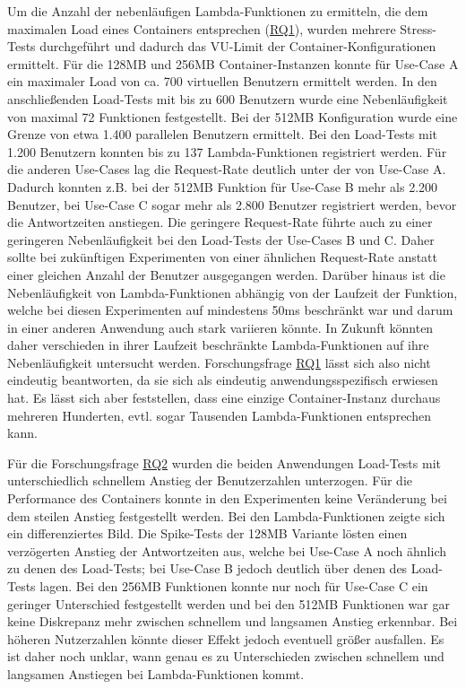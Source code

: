 Um die Anzahl der nebenläufigen Lambda-Funktionen zu ermitteln, die dem maximalen Load eines Containers entsprechen (\hyperref[tab:research-questions]{RQ1}), wurden mehrere Stress-Tests durchgeführt und dadurch das \ac{VU}-Limit der Container-Konfigurationen ermittelt. Für die 128MB und 256MB Container-Instanzen konnte für Use-Case A ein maximaler Load von ca. 700 virtuellen Benutzern ermittelt werden. In den anschließenden Load-Tests mit bis zu 600 Benutzern wurde eine Nebenläufigkeit von maximal 72 Funktionen festgestellt. Bei der 512MB Konfiguration wurde eine Grenze von etwa 1.400 parallelen Benutzern ermittelt. Bei den Load-Tests mit 1.200 Benutzern konnten bis zu 137 Lambda-Funktionen registriert werden. 
Für die anderen Use-Cases lag die Request-Rate deutlich unter der von Use-Case A. Dadurch konnten z.B. bei der 512MB Funktion für Use-Case B mehr als 2.200 Benutzer, bei Use-Case C sogar mehr als 2.800 Benutzer registriert werden, bevor die Antwortzeiten anstiegen. Die geringere Request-Rate führte auch zu einer geringeren Nebenläufigkeit bei den Load-Tests der Use-Cases B und C. Daher sollte bei zukünftigen Experimenten von einer ähnlichen Request-Rate anstatt einer gleichen Anzahl der Benutzer ausgegangen werden.
Darüber hinaus ist die Nebenläufigkeit von Lambda-Funktionen abhängig von der Laufzeit der Funktion, welche bei diesen Experimenten auf mindestens 50ms beschränkt war und darum in einer anderen Anwendung auch stark variieren könnte. In Zukunft könnten daher verschieden in ihrer Laufzeit beschränkte Lambda-Funktionen auf ihre Nebenläufigkeit untersucht werden.
Forschungsfrage \hyperref[tab:research-questions]{RQ1} lässt sich also nicht eindeutig beantworten, da sie sich als eindeutig anwendungsspezifisch erwiesen hat. Es lässt sich aber feststellen, dass eine einzige Container-Instanz durchaus mehreren Hunderten, evtl. sogar Tausenden Lambda-Funktionen entsprechen kann.

Für die Forschungsfrage \hyperref[tab:research-questions]{RQ2} wurden die beiden Anwendungen Load-Tests mit unterschiedlich schnellem Anstieg der Benutzerzahlen unterzogen. Für die Performance des Containers konnte in den Experimenten keine Veränderung bei dem steilen Anstieg festgestellt werden. Bei den Lambda-Funktionen zeigte sich ein differenziertes Bild. Die Spike-Tests der 128MB Variante lösten einen verzögerten Anstieg der Antwortzeiten aus, welche bei Use-Case A noch ähnlich zu denen des Load-Tests; bei Use-Case B jedoch deutlich über denen des Load-Tests lagen. Bei den 256MB Funktionen konnte nur noch für Use-Case C ein geringer Unterschied festgestellt werden und bei den 512MB Funktionen war gar keine Diskrepanz mehr zwischen schnellem und langsamen Anstieg erkennbar. Bei höheren Nutzerzahlen könnte dieser Effekt jedoch eventuell größer ausfallen. Es ist daher noch unklar, wann genau es zu Unterschieden zwischen schnellem und langsamen Anstiegen bei Lambda-Funktionen kommt.

